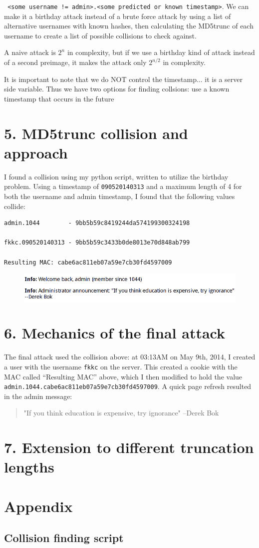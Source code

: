\documentclass[12pt,letterpaper]{article}
\begin{document}
\verb~ <some username != admin>.<some predicted or known timestamp>~. We can
make it a birthday attack instead of a brute force attack by using a list of
alternative usernames with known hashes, then calculating the MD5trunc of each
username to create a list of possible collisions to check against.

A naive attack is $2^n$ in complexity, but if we use a birthday kind of attack
instead of a second preimage, it makes the attack only $2^{n/2}$ in complexity.

It is important to note that we do NOT control the timestamp... it is a server
side variable. Thus we have two options for finding collsions: use a known
timestamp that occurs in the future

\section*{5. MD5trunc collision and approach}
I found a collision using my python script, written to utilize the birthday
problem. Using a timestamp of \verb~090520140313~ and a maximum length of 4
for both the username and admin timestamp, I found that the following
values collide:
\begin{verbatim}
admin.1044        - 9bb5b59c8419244da574199300324198

fkkc.090520140313 - 9bb5b59c3433b0de8013e70d848ab799

Resulting MAC: cabe6ac811eb07a59e7cb30fd4597009
\end{verbatim}

\begin{figure}[H]
\centering
\includegraphics[width=5in]{admin4.png}
\end{figure}

\section*{6. Mechanics of the final attack}
The final attack used the collision above: at 03:13AM on May 9th, 2014, I created
a user with the username \verb~fkkc~ on the server. This created a cookie
with the MAC called ``Resulting MAC'' above, which I then modified to hold
the value \verb~admin.1044.cabe6ac811eb07a59e7cb30fd4597009~. A quick page
refresh resulted in the admin message:

\begin{verse}
"If you think education is expensive, try ignorance" --Derek Bok 
\end{verse}

\section*{7. Extension to different truncation lengths}

\section*{Appendix}
\subsection{Collision finding script}

\end{document}
